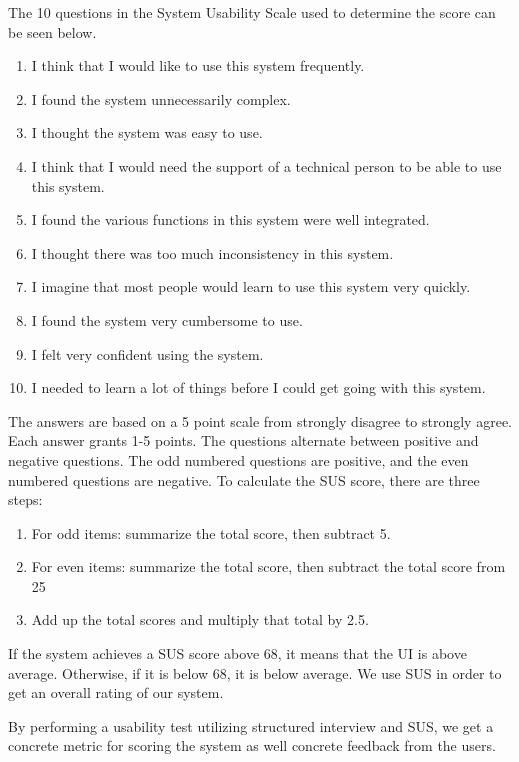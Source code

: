 The 10 questions in the System Usability Scale used to determine the score can be seen below.
\begin{enumerate}
	\item I think that I would like to use this system frequently.
	\item I found the system unnecessarily complex.
	\item I thought the system was easy to use.
	\item I think that I would need the support of a technical person to be able to use this system.
	\item I found the various functions in this system were well integrated.
	\item I thought there was too much inconsistency in this system.
	\item I imagine that most people would learn to use this system very quickly.
	\item I found the system very cumbersome to use.
	\item I felt very confident using the system.
	\item I needed to learn a lot of things before I could get going with this system.
\end{enumerate}
The answers are based on a 5 point scale from strongly disagree to strongly agree.
Each answer grants 1-5 points.
The questions alternate between positive and negative questions. The odd numbered questions are positive, and the even numbered questions are negative.\cite{adobeSUS}
To calculate the SUS score, there are three steps:
\begin{enumerate}
	\item For odd items: summarize the total score, then subtract 5.
	\item For even items: summarize the total score, then subtract the total score from 25
	\item Add up the total scores and multiply that total by 2.5.
\end{enumerate}
If the system achieves a SUS score above 68, it means that the UI is above average. Otherwise, if it is below 68, it is below average\cite{adobeSUS}.
We use SUS in order to get an overall rating of our system.

By performing a usability test utilizing structured interview and SUS, we get a concrete metric for scoring the system as well concrete feedback from the users.

